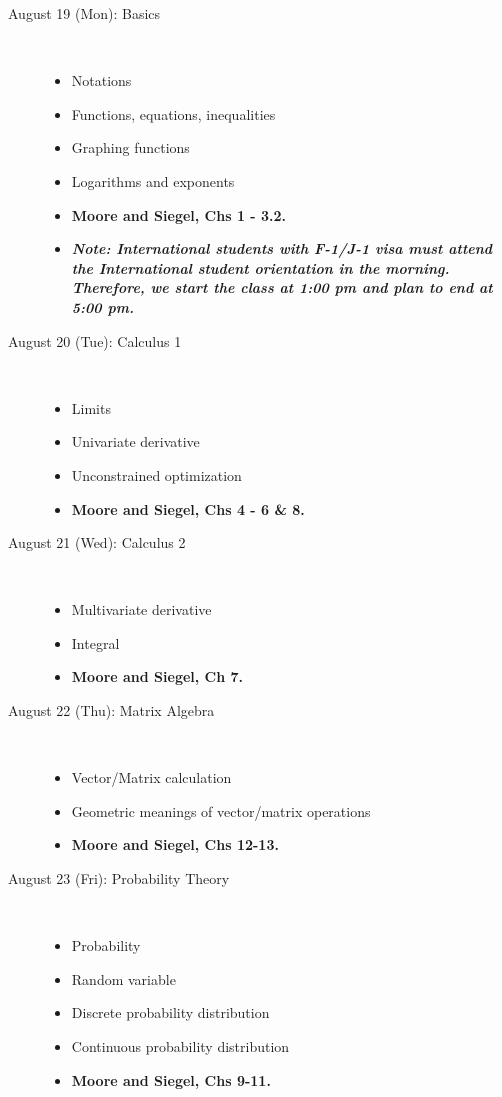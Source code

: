 \documentclass[pdflatex, letterpaper, 12pt]{scrartcl}
\begin{document}
\begin{description}
\item[August 19 (Mon): Basics] \ 
 \begin{itemize}
 \item Notations
 \item Functions, equations, inequalities
 \item Graphing functions
 \item Logarithms and exponents
 \item \textbf{Moore and Siegel, Chs 1 - 3.2.}
 \item \textbf{\textit{Note: International students with F-1/J-1 visa must attend the International student orientation in the morning. Therefore, we start the class at 1:00 pm and plan to end at 5:00 pm.}}
 \end{itemize}
\item[August 20 (Tue): Calculus 1] \ 
 \begin{itemize}
 \item Limits
 \item Univariate derivative
 \item Unconstrained optimization
 \item \textbf{Moore and Siegel, Chs 4 - 6 \& 8.} 
 \end{itemize}
\item[August 21 (Wed): Calculus 2] \
 \begin{itemize}
 \item Multivariate derivative
 \item Integral
 \item \textbf{Moore and Siegel, Ch 7.}
 \end{itemize}
\item[August 22 (Thu): Matrix Algebra] \ 
 \begin{itemize}
 \item Vector/Matrix calculation
 \item Geometric meanings of vector/matrix operations
 \item \textbf{Moore and Siegel, Chs 12-13.}
 \end{itemize}
\item[August 23 (Fri): Probability Theory] \
 \begin{itemize}
 \item Probability
 \item Random variable
 \item Discrete probability distribution
 \item Continuous probability distribution 
 \item \textbf{Moore and Siegel, Chs 9-11.}
 \end{itemize}
\end{description}
\end{document}
